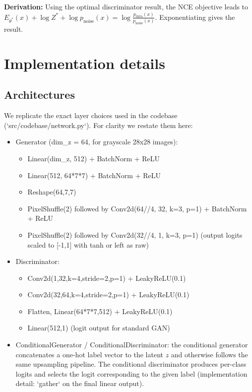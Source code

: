 \documentclass{article}
\begin{document}
\textbf{Derivation:} Using the optimal discriminator result, the NCE objective leads to $E_{\theta^*}(x) + \log Z^* + \log p_{\text{noise}}(x) = \log \frac{p_{\text{data}}(x)}{p_{\text{noise}}(x)}$. Exponentiating gives the result.

\section{Implementation details}
\subsection{Architectures}
We replicate the exact layer choices used in the codebase (`src/codebase/network.py`). For clarity we restate them here:
\begin{itemize}
  \item Generator (dim_z = 64, for grayscale 28x28 images):
    \begin{itemize}
      \item Linear(dim_z, 512) + BatchNorm + ReLU
      \item Linear(512, 64*7*7) + BatchNorm + ReLU
      \item Reshape(64,7,7)
      \item PixelShuffle(2) followed by Conv2d(64//4, 32, k=3, p=1) + BatchNorm + ReLU
      \item PixelShuffle(2) followed by Conv2d(32//4, 1, k=3, p=1) (output logits scaled to [-1,1] with tanh or left as raw)
    \end{itemize}
  \item Discriminator:
    \begin{itemize}
      \item Conv2d(1,32,k=4,stride=2,p=1) + LeakyReLU(0.1)
      \item Conv2d(32,64,k=4,stride=2,p=1) + LeakyReLU(0.1)
      \item Flatten, Linear(64*7*7,512) + LeakyReLU(0.1)
      \item Linear(512,1) (logit output for standard GAN)
    \end{itemize}
  \item ConditionalGenerator / ConditionalDiscriminator: the conditional generator concatenates a one-hot label vector to the latent $z$ and otherwise follows the same upsampling pipeline. The conditional discriminator produces per-class logits and selects the logit corresponding to the given label (implementation detail: `gather` on the final linear output).
\end{itemize}
\end{document}
